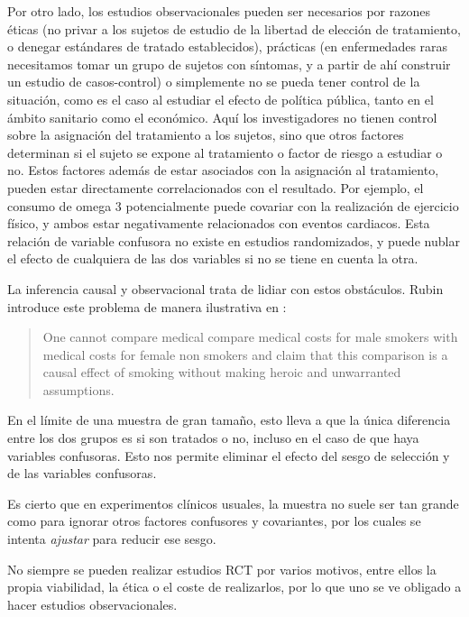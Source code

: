 Por otro lado, los estudios observacionales pueden ser necesarios por razones éticas
(no privar a los sujetos de estudio de la libertad de elección de tratamiento, o
denegar estándares de tratado establecidos),
prácticas (en enfermedades raras necesitamos tomar un grupo de sujetos con
síntomas, y a partir de ahí construir un estudio de casos-control) o
simplemente no se pueda tener control de la situación, como es el caso
al estudiar el efecto de política pública, tanto en el ámbito sanitario como
el económico.
Aquí los investigadores no tienen control sobre la asignación del tratamiento
a los sujetos, sino que otros factores determinan
si el sujeto se expone al tratamiento o factor de riesgo a estudiar o no.
Estos factores además de estar asociados con la asignación al
tratamiento, pueden estar directamente correlacionados con el resultado.
Por ejemplo, el consumo de omega 3 potencialmente puede covariar con la realización de
ejercicio físico, y ambos estar negativamente relacionados con eventos cardiacos.
Esta relación de variable confusora\footnotemark{} no existe en estudios randomizados,
y puede nublar el efecto de cualquiera de las dos variables si no se tiene en cuenta
la otra.

La inferencia causal y observacional trata de lidiar con estos obstáculos.
Rubin introduce este problema de manera ilustrativa en
\cite[sección 2, párr. 6]{rubin2005}:
\begin{quotation}
    One cannot compare medical compare medical costs for male
    smokers with medical costs for female non smokers and claim
    that this comparison is a causal effect of smoking without
    making heroic and unwarranted assumptions.
\end{quotation}

\iffalse
    En el límite de una muestra de gran tamaño, esto lleva a que la única diferencia entre los dos grupos es si son tratados o no,
    incluso en el caso de que haya variables confusoras.
    Esto nos permite eliminar el efecto del sesgo de selección y de las variables confusoras.

    Es cierto que en experimentos clínicos usuales, la muestra no suele ser tan grande como para ignorar
    otros factores confusores y covariantes, por los cuales se intenta \textit{ajustar} para reducir ese sesgo.

    No siempre se pueden realizar estudios RCT por varios motivos, entre ellos la propia viabilidad, la ética o el coste
    de realizarlos, por lo que uno se ve obligado a hacer estudios observacionales.

